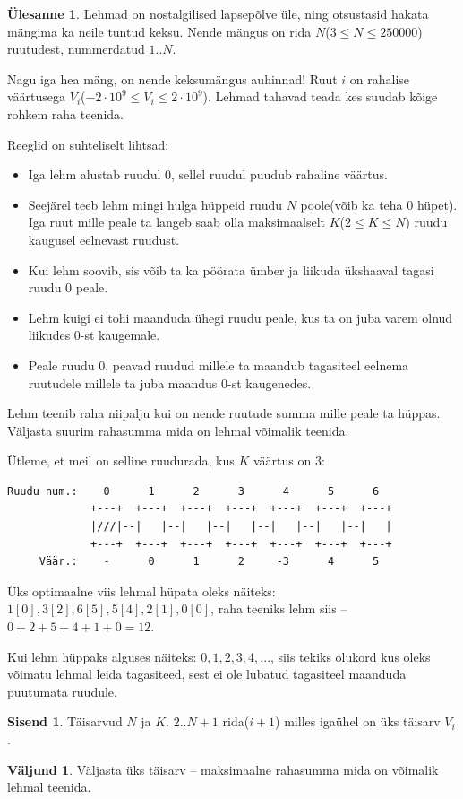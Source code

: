 \documentclass{trkut}
\theoremstyle{definition}
\newtheorem*{Input}{Sisend}
\newtheorem*{Output}{Väljund}
\newtheorem*{Text}{Ülesanne}
\begin{document}
\begin{Text}
Lehmad on nostalgilised lapsepõlve üle, ning otsustasid hakata mängima ka neile tuntud keksu. Nende mängus on rida $N$($3\le N\le 250000$) ruutudest, nummerdatud $1..N$.

Nagu iga hea mäng, on nende keksumängus auhinnad! Ruut $i$ on rahalise väärtusega $V_i$($-2\cdot 10^9\le V_i\le 2\cdot 10^9$). Lehmad tahavad teada kes suudab kõige rohkem raha teenida.

Reeglid on suhteliselt lihtsad:
\begin{itemize}
    \item Iga lehm alustab ruudul $0$, sellel ruudul puudub rahaline väärtus.
    \item Seejärel teeb lehm mingi hulga hüppeid ruudu $N$ poole(võib ka teha $0$ hüpet). Iga ruut mille peale ta langeb saab olla maksimaalselt $K$($2\le K\le N$) ruudu kaugusel eelnevast ruudust.
    \item Kui lehm soovib, sis võib ta ka pöörata ümber ja liikuda ükshaaval tagasi ruudu $0$ peale.
    \item Lehm kuigi ei tohi maanduda ühegi ruudu peale, kus ta on juba varem olnud liikudes $0$-st kaugemale.
    \item Peale ruudu $0$, peavad ruudud millele ta maandub tagasiteel eelnema ruutudele millele ta juba maandus $0$-st kaugenedes.
\end{itemize}

Lehm teenib raha niipalju kui on nende ruutude summa mille peale ta hüppas. Väljasta suurim rahasumma mida on lehmal võimalik teenida.

Ütleme, et meil on selline ruudurada, kus $K$ väärtus on $3$:
\begin{verbatim}
Ruudu num.:    0      1      2      3      4      5      6
             +---+  +---+  +---+  +---+  +---+  +---+  +---+
             |///|--|   |--|   |--|   |--|   |--|   |--|   |
             +---+  +---+  +---+  +---+  +---+  +---+  +---+
     Väär.:    -      0      1      2     -3      4      5
\end{verbatim}
Üks optimaalne viis lehmal hüpata oleks näiteks: $1[0], 3[2], 6[5], 5[4], 2[1], 0[0]$, raha teeniks lehm siis -- $0+2+5+4+1+0=12$.

Kui lehm hüppaks alguses näiteks: $0, 1, 2, 3, 4, ...$, siis tekiks olukord kus oleks võimatu lehmal leida tagasiteed, sest ei ole lubatud tagasiteel maanduda puutumata ruudule.

\parencite{18}
\end{Text}
\begin{Input}
Täisarvud $N$ ja $K$.
$2..N+1$ rida($i+1$) milles igaühel on üks täisarv $V_i$.
\end{Input}
\begin{Output}
Väljasta üks täisarv -- maksimaalne rahasumma mida on võimalik lehmal teenida.
\end{Output}
\end{document}

